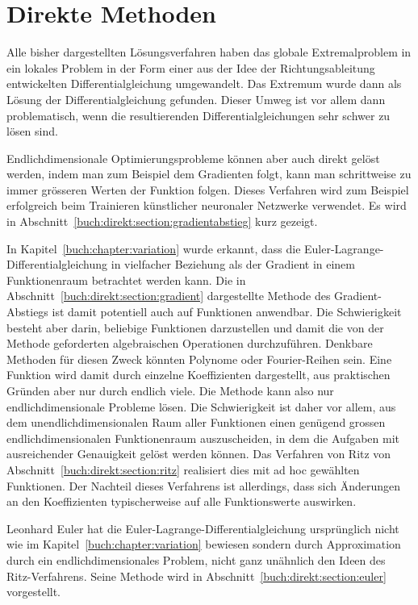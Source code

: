 %
%
%
\chapter{Direkte Methoden
\label{buch:chapter:direkt}}
Alle bisher dargestellten Lösungsverfahren haben das globale Extremalproblem
in ein lokales Problem in der Form einer aus der Idee der Richtungsableitung
entwickelten Differentialgleichung umgewandelt.
Das Extremum wurde dann als Lösung der Differentialgleichung gefunden.
Dieser Umweg ist vor allem dann problematisch, wenn die resultierenden
Differentialgleichungen sehr schwer zu lösen sind.

Endlichdimensionale Optimierungsprobleme können aber auch direkt gelöst
werden, indem man zum Beispiel dem Gradienten folgt, kann man schrittweise
zu immer grösseren Werten der Funktion folgen.
Dieses Verfahren wird zum Beispiel erfolgreich beim Trainieren
künstlicher neuronaler Netzwerke verwendet.
Es wird in Abschnitt~\ref{buch:direkt:section:gradientabstieg}
kurz gezeigt.

In Kapitel~\ref{buch:chapter:variation} wurde erkannt, dass die
Euler-Lagrange-Differentialgleichung in vielfacher Beziehung als 
der Gradient in einem Funktionenraum betrachtet werden kann.
Die in Abschnitt~\ref{buch:direkt:section:gradient} dargestellte
Methode des Gradient-Abstiegs ist damit potentiell auch auf Funktionen
anwendbar.
Die Schwierigkeit besteht aber darin, beliebige Funktionen darzustellen
und damit die von der Methode geforderten algebraischen Operationen
durchzuführen.
Denkbare Methoden für diesen Zweck könnten Polynome oder Fourier-Reihen
sein.
Eine Funktion wird damit durch einzelne Koeffizienten dargestellt, aus
praktischen Gründen aber nur durch endlich viele.
Die Methode kann also nur endlichdimensionale Probleme lösen.
Die Schwierigkeit ist daher vor allem, aus dem unendlichdimensionalen
Raum aller Funktionen einen genügend grossen endlichdimensionalen
Funktionenraum auszuscheiden, in dem die Aufgaben mit ausreichender
Genauigkeit gelöst werden können.
Das Verfahren von Ritz von Abschnitt~\ref{buch:direkt:section:ritz}
realisiert dies mit ad hoc gewählten Funktionen.
Der Nachteil dieses Verfahrens ist allerdings, dass sich Änderungen an
den Koeffizienten typischerweise auf alle Funktionswerte auswirken.

Leonhard Euler hat die Euler-Lagrange-Differentialgleichung ursprünglich
nicht wie im Kapitel~\ref{buch:chapter:variation} bewiesen sondern durch
Approximation durch ein endlichdimensionales Problem, nicht ganz
unähnlich den Ideen des Ritz-Verfahrens.
Seine Methode wird in Abschnitt~\ref{buch:direkt:section:euler}
vorgestellt.




